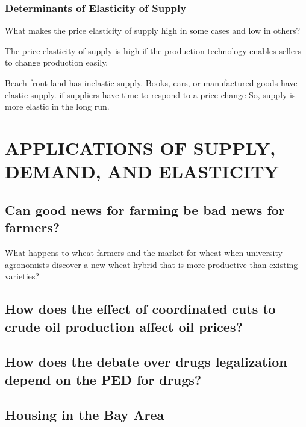 \documentclass[
  letterpaper,
]{book}
\begin{document}
\subsubsection{Determinants of Elasticity of
Supply}\label{determinants-of-elasticity-of-supply}

What makes the price elasticity of supply high in some cases and low in
others?

The price elasticity of supply is high if the production technology
enables sellers to change production easily.

Beach-front land has inelastic supply. Books, cars, or manufactured
goods have elastic supply. if suppliers have time to respond to a price
change So, supply is more elastic in the long run.

\section{APPLICATIONS OF SUPPLY, DEMAND, AND
ELASTICITY}\label{applications-of-supply-demand-and-elasticity}

\subsection{Can good news for farming be bad news for
farmers?}\label{can-good-news-for-farming-be-bad-news-for-farmers}

What happens to wheat farmers and the market for wheat when university
agronomists discover a new wheat hybrid that is more productive than
existing varieties?

\subsection{How does the effect of coordinated cuts to crude oil
production affect oil
prices?}\label{how-does-the-effect-of-coordinated-cuts-to-crude-oil-production-affect-oil-prices}

\subsection{How does the debate over drugs legalization depend on the
PED for
drugs?}\label{how-does-the-debate-over-drugs-legalization-depend-on-the-ped-for-drugs}

\subsection{Housing in the Bay Area}\label{housing-in-the-bay-area}
\end{document}
